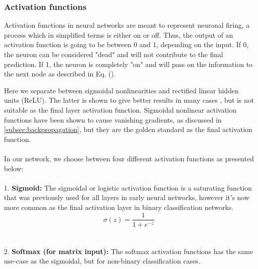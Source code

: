 \subsubsection{Activation functions}\label{sssec:activation_functions}

Activation functions in neural networks are meant to represent neuronal firing, a process which in simplified terms is either on or off. Thus, the output 
of an activation function is going to be between 0 and 1, depending on the input. If 0, the neuron can be considered "dead" and will not contribute 
to the final prediction. If 1, the neuron is completely "on" and will pass on the information to the next node as described in Eq. (\cite{ffnn}). 

Here we separate between sigmoidal nonlinearities and rectified linear hidden units (ReLU). The latter is shown to give better results in many cases 
\cite{relu_best_ever}, but is not suitable as the final layer activation function. Sigmoidal nonlinear activation functions have been shown to 
cause vanishing gradients, as discussed in \ref{subsec:backpropagation}, but they are the golden standard as the final activation function. 
\\
\\
In our network, we choose between four different activation functions as presented below: 
\\
\\
1. \textbf{Sigmoid:}
The sigmoidal or logistic activation function is a saturating function that was previously used for all layers in early neural networks, 
however it's now more common as the final activation layer in binary classification networks.
\[
\sigma(z) = \frac{1}{1 + e^{-z}}
\]
\\
\\
2. \textbf{Softmax (for matrix input):}
The softmax activation functions has the same use-case as the sigmoidal, but for non-binary classification cases. 

